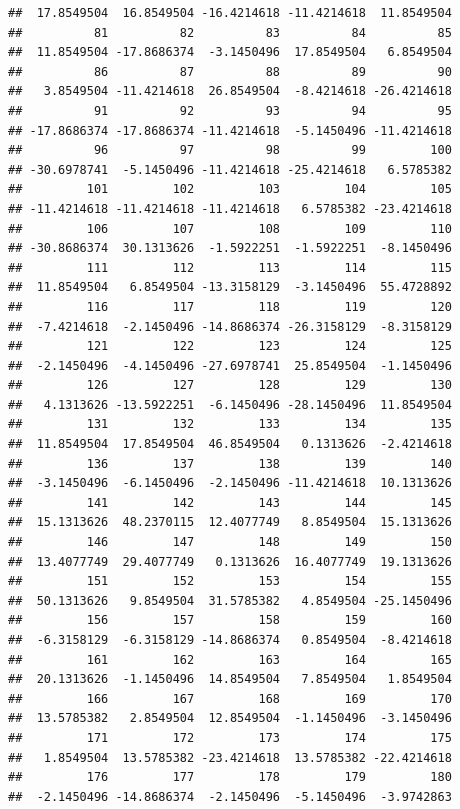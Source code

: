 \documentclass[
]{book}
\begin{document}
\begin{verbatim}
##  17.8549504  16.8549504 -16.4214618 -11.4214618  11.8549504 
##          81          82          83          84          85 
##  11.8549504 -17.8686374  -3.1450496  17.8549504   6.8549504 
##          86          87          88          89          90 
##   3.8549504 -11.4214618  26.8549504  -8.4214618 -26.4214618 
##          91          92          93          94          95 
## -17.8686374 -17.8686374 -11.4214618  -5.1450496 -11.4214618 
##          96          97          98          99         100 
## -30.6978741  -5.1450496 -11.4214618 -25.4214618   6.5785382 
##         101         102         103         104         105 
## -11.4214618 -11.4214618 -11.4214618   6.5785382 -23.4214618 
##         106         107         108         109         110 
## -30.8686374  30.1313626  -1.5922251  -1.5922251  -8.1450496 
##         111         112         113         114         115 
##  11.8549504   6.8549504 -13.3158129  -3.1450496  55.4728892 
##         116         117         118         119         120 
##  -7.4214618  -2.1450496 -14.8686374 -26.3158129  -8.3158129 
##         121         122         123         124         125 
##  -2.1450496  -4.1450496 -27.6978741  25.8549504  -1.1450496 
##         126         127         128         129         130 
##   4.1313626 -13.5922251  -6.1450496 -28.1450496  11.8549504 
##         131         132         133         134         135 
##  11.8549504  17.8549504  46.8549504   0.1313626  -2.4214618 
##         136         137         138         139         140 
##  -3.1450496  -6.1450496  -2.1450496 -11.4214618  10.1313626 
##         141         142         143         144         145 
##  15.1313626  48.2370115  12.4077749   8.8549504  15.1313626 
##         146         147         148         149         150 
##  13.4077749  29.4077749   0.1313626  16.4077749  19.1313626 
##         151         152         153         154         155 
##  50.1313626   9.8549504  31.5785382   4.8549504 -25.1450496 
##         156         157         158         159         160 
##  -6.3158129  -6.3158129 -14.8686374   0.8549504  -8.4214618 
##         161         162         163         164         165 
##  20.1313626  -1.1450496  14.8549504   7.8549504   1.8549504 
##         166         167         168         169         170 
##  13.5785382   2.8549504  12.8549504  -1.1450496  -3.1450496 
##         171         172         173         174         175 
##   1.8549504  13.5785382 -23.4214618  13.5785382 -22.4214618 
##         176         177         178         179         180 
##  -2.1450496 -14.8686374  -2.1450496  -5.1450496  -3.9742863 

\end{verbatim}
\end{document}
